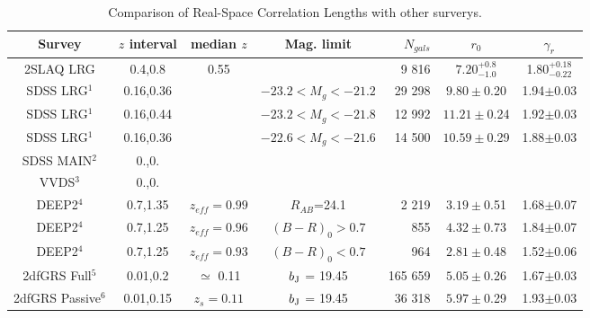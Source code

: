 \documentclass[usenatbib]{mn2e}
\def \bj {b_{\rm J}}
\begin{document}
\begin{table*}
\baselineskip=20pt
\begin{center}
\caption{Comparison of Real-Space Correlation Lengths with other surverys.}
\setlength{\tabcolsep}{1pt}
\begin{tabular}{ccccrcc}
\hline
Survey            & $z$ interval &  median $z$     & Mag. limit & $N_{gals}$ & $r_{0}$  & $\gamma_{r}$    \\
\hline
2SLAQ LRG          & 0.4,0.8    & 0.55           &                          &    9 816 & $ 7.20^{+0.8}_{-1.0}$ & 1.80$^{+0.18}_{-0.22}$   \\
SDSS LRG$^1$       & 0.16,0.36  &                & $-23.2 < M_{g} < -21.2 $ &   29 298 & $ 9.80\pm$0.20        & 1.94$\pm$0.03            \\
SDSS LRG$^1$       & 0.16,0.44  &                & $-23.2 < M_{g} < -21.8 $ &   12 992 & $11.21\pm$0.24        & 1.92$\pm$0.03            \\
SDSS LRG$^1$       & 0.16,0.36  &                & $-22.6 < M_{g} < -21.6 $ &   14 500 & $10.59\pm$0.29        & 1.88$\pm$0.03            \\
SDSS MAIN$^2$      & 0.,0.      &                &                          &          &                       &                          \\
VVDS$^3$           & 0.,0.      &                &                          &          &                       &                          \\
DEEP2$^4$          & 0.7,1.35   & $z_{eff}=0.99$ & $R_{AB}$=24.1            &    2 219 & $3.19\pm$0.51         & 1.68$\pm$0.07            \\
DEEP2$^4$          & 0.7,1.25   & $z_{eff}=0.96$ & $(B-R)_0 >0.7$           &      855 & $4.32\pm$0.73         & 1.84$\pm$0.07            \\
DEEP2$^4$          & 0.7,1.25   & $z_{eff}=0.93$ & $(B-R)_0 <0.7$           &      964 & $2.81\pm$0.48         & 1.52$\pm$0.06            \\
2dfGRS Full$^5$    & 0.01,0.2   & $\simeq$ 0.11  & $\bj$ = 19.45            &  165 659 & $5.05\pm$0.26         & 1.67$\pm$0.03            \\
2dfGRS Passive$^6$ & 0.01,0.15  & $z_{s}= 0.11$  & $\bj$ = 19.45            &   36 318 & $5.97\pm$0.29         & 1.93$\pm$0.03            \\

\end{tabular}
\end{center}
\end{table*}
\end{document}
